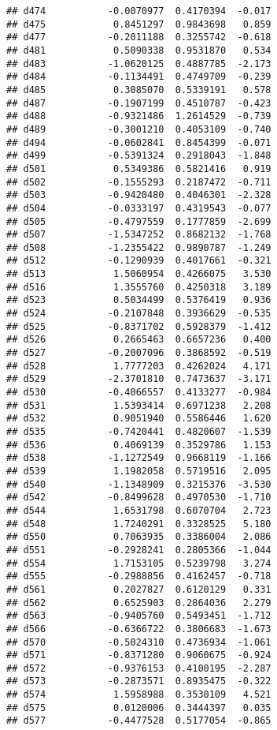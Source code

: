 \documentclass[
]{article}
\begin{document}
\begin{verbatim}
## d474           -0.0070977  0.4170394  -0.017
## d475            0.8451297  0.9843698   0.859
## d477           -0.2011188  0.3255742  -0.618
## d481            0.5090338  0.9531870   0.534
## d483           -1.0620125  0.4887785  -2.173
## d484           -0.1134491  0.4749709  -0.239
## d485            0.3085070  0.5339191   0.578
## d487           -0.1907199  0.4510787  -0.423
## d488           -0.9321486  1.2614529  -0.739
## d489           -0.3001210  0.4053109  -0.740
## d494           -0.0602841  0.8454399  -0.071
## d499           -0.5391324  0.2918043  -1.848
## d501            0.5349386  0.5821416   0.919
## d502           -0.1555293  0.2187472  -0.711
## d503           -0.9420480  0.4046301  -2.328
## d504           -0.0333197  0.4319543  -0.077
## d505           -0.4797559  0.1777859  -2.699
## d507           -1.5347252  0.8682132  -1.768
## d508           -1.2355422  0.9890787  -1.249
## d512           -0.1290939  0.4017661  -0.321
## d513            1.5060954  0.4266075   3.530
## d516            1.3555760  0.4250318   3.189
## d523            0.5034499  0.5376419   0.936
## d524           -0.2107848  0.3936629  -0.535
## d525           -0.8371702  0.5928379  -1.412
## d526            0.2665463  0.6657236   0.400
## d527           -0.2007096  0.3868592  -0.519
## d528            1.7777203  0.4262024   4.171
## d529           -2.3701810  0.7473637  -3.171
## d530           -0.4066557  0.4133277  -0.984
## d531            1.5393414  0.6971238   2.208
## d532            0.9051940  0.5586446   1.620
## d535           -0.7420441  0.4820607  -1.539
## d536            0.4069139  0.3529786   1.153
## d538           -1.1272549  0.9668119  -1.166
## d539            1.1982058  0.5719516   2.095
## d540           -1.1348909  0.3215376  -3.530
## d542           -0.8499628  0.4970530  -1.710
## d544            1.6531798  0.6070704   2.723
## d548            1.7240291  0.3328525   5.180
## d550            0.7063935  0.3386004   2.086
## d551           -0.2928241  0.2805366  -1.044
## d554            1.7153105  0.5239798   3.274
## d555           -0.2988856  0.4162457  -0.718
## d561            0.2027827  0.6120129   0.331
## d562            0.6525903  0.2864036   2.279
## d563           -0.9405760  0.5493451  -1.712
## d566           -0.6366722  0.3806683  -1.673
## d570           -0.5024310  0.4736934  -1.061
## d571           -0.8371280  0.9060675  -0.924
## d572           -0.9376153  0.4100195  -2.287
## d573           -0.2873571  0.8935475  -0.322
## d574            1.5958988  0.3530109   4.521
## d575            0.0120006  0.3444397   0.035
## d577           -0.4477528  0.5177054  -0.865

\end{verbatim}
\end{document}

